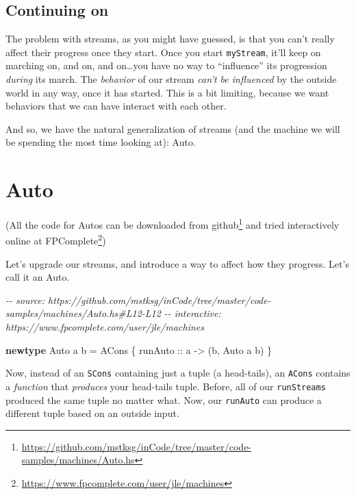 \documentclass[]{article}
\newenvironment{Shaded}{}{}
\newcommand{\CommentTok}[1]{\textcolor[rgb]{0.38,0.63,0.69}{\textit{#1}}}
\newcommand{\DataTypeTok}[1]{\textcolor[rgb]{0.56,0.13,0.00}{#1}}
\newcommand{\KeywordTok}[1]{\textcolor[rgb]{0.00,0.44,0.13}{\textbf{#1}}}
\newcommand{\NormalTok}[1]{#1}
\newcommand{\OtherTok}[1]{\textcolor[rgb]{0.00,0.44,0.13}{#1}}
\renewcommand{\href}[2]{#2\footnote{\url{#1}}}
\begin{document}
\subsection{Continuing on}\label{continuing-on}

The problem with streams, as you might have guessed, is that you can't really
affect their progress once they start. Once you start \texttt{myStream}, it'll
keep on marching on, and on, and on\ldots you have no way to ``influence'' its
progression \emph{during} its march. The \emph{behavior} of our stream
\emph{can't be influenced} by the outside world in any way, once it has started.
This is a bit limiting, because we want behaviors that we can have interact with
each other.

And so, we have the natural generalization of streams (and the machine we will
be spending the most time looking at): Auto.

\section{Auto}\label{auto}

(All the code for Autos can be downloaded
\href{https://github.com/mstksg/inCode/tree/master/code-samples/machines/Auto.hs}{from
github} and tried interactively online
\href{https://www.fpcomplete.com/user/jle/machines}{at FPComplete})

Let's upgrade our streams, and introduce a way to affect how they progress.
Let's call it an Auto.

\begin{Shaded}
\begin{Highlighting}[]
\CommentTok{{-}{-} source: https://github.com/mstksg/inCode/tree/master/code{-}samples/machines/Auto.hs\#L12{-}L12}
\CommentTok{{-}{-} interactive: https://www.fpcomplete.com/user/jle/machines}

\KeywordTok{newtype} \DataTypeTok{Auto}\NormalTok{ a b }\OtherTok{=} \DataTypeTok{ACons}\NormalTok{ \{}\OtherTok{ runAuto ::}\NormalTok{ a }\OtherTok{{-}\textgreater{}}\NormalTok{ (b, }\DataTypeTok{Auto}\NormalTok{ a b) \}}
\end{Highlighting}
\end{Shaded}

Now, instead of an \texttt{SCons} containing just a tuple (a head-tails), an
\texttt{ACons} contains a \emph{function} that \emph{produces} your head-tails
tuple. Before, all of our \texttt{runStreams} produced the same tuple no matter
what. Now, our \texttt{runAuto} can produce a different tuple based on an
outside input.
\end{document}
